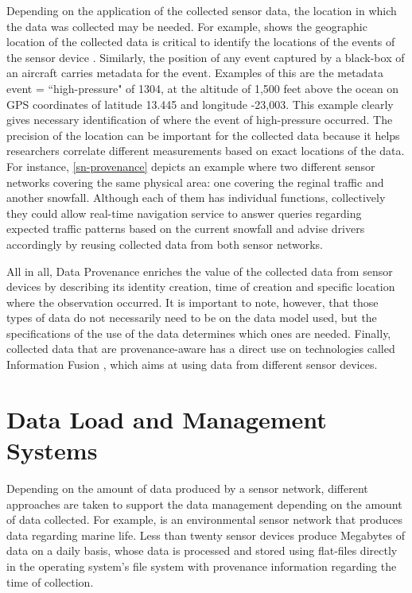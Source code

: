 Depending on the application of the collected sensor data, the location in
which the data was collected may be needed. For example, \cite{sn-geo-metadata}
shows the geographic location of the collected data is critical to identify
the locations of the events of the sensor device \cite{sn-ex02}. Similarly,
the position of any event captured by a black-box of an aircraft carries 
metadata for the event. Examples of this are the metadata event =
``high-pressure" of 1304, at the altitude of 1,500 feet above the ocean on GPS
coordinates of latitude 13.445 and longitude -23,003. This example clearly
gives necessary identification of where the event of high-pressure occurred.
The precision of the location can be important for the collected data because
it helps researchers correlate different measurements based on exact locations
of the data. For instance, \ref{sn-provenance} depicts an example where two
different sensor networks covering the same physical area: one covering the
reginal traffic and another snowfall. Although each of them has individual
functions, collectively they could allow real-time navigation service to answer
queries regarding expected traffic patterns based on the current snowfall and
advise drivers accordingly by reusing collected data from both sensor networks.

All in all, Data Provenance enriches the value of the collected data from
sensor devices by describing its identity creation, time of creation and
specific location where the observation occurred. It is important to note,
however, that those types of data do not necessarily need to be on the data
model used, but the specifications of the use of the data determines which
ones are needed. Finally, collected data that are provenance-aware has a direct
use on technologies called Information Fusion \cite{sn-info-fusion}, which aims
at using data from different sensor devices.

\section{Data Load and Management Systems}
\label{sec:data-load}

Depending on the amount of data produced by a sensor network, different
approaches are taken to support the data management depending on
the amount of data collected. For example, \cite{sfbeams2006} is an
environmental sensor network that produces data regarding marine life.
Less than twenty sensor devices produce Megabytes of data on a daily basis,
whose data is processed and stored using flat-files directly in the
operating system's file system with provenance information regarding the time
of collection.

